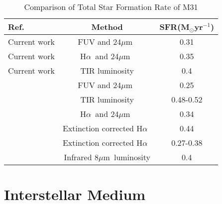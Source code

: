 \documentclass[useAMS,usenatbib]{mn2e}
\newcommand \halpha    {H$\alpha $\ }
\newcommand \um    {$\mu$m\ }
\begin{document}
\begin{table*}
\begin{minipage}{100mm}
\caption{Comparison of Total Star Formation Rate of M31}
\label{table:sfr}
\begin{tabular}{@{}lcc}
\hline\hline
Ref.&Method&SFR(M$_{\odot}$yr$^{-1}$) \\
\hline
Current work&FUV and 24\um&0.31\\
Current work&\halpha and 24\um&0.35\\
Current work&TIR luminosity&0.4\\
\cite{Ford13}&FUV and 24\um&0.25\\
\cite{Ford13}&TIR luminosity&0.48-0.52\\
\cite{Azimlu11}& \halpha and 24\um&0.34\\
\cite{Azimlu11}&Extinction corrected \halpha&0.44\\
\cite{Tabatabaei10}&Extinction corrected \halpha&0.27-0.38\\
\cite{Barmby06}&Infrared 8\um luminosity& 0.4\\
\hline
\end{tabular}
\end{minipage}
\end{table*}


\section{Interstellar Medium}

\end{document}
